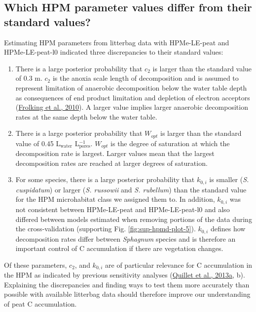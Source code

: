 \documentclass[
  12pt,
]{article}
\begin{document}
\hypertarget{out-discussion-1}{%
\subsection{Which HPM parameter values differ from their standard values?}\label{out-discussion-1}}

Estimating HPM parameters from litterbag data with HPMe-LE-peat and HPMe-LE-peat-l0 indicated three discrepancies to their standard values:

\begin{enumerate}
\def\labelenumi{\arabic{enumi}.}
\item
  There is a large posterior probability that \(c_2\) is larger than the standard value of 0.3 m. \(c_2\) is the anoxia scale length of decomposition and is assumed to represent limitation of anaerobic decomposition below the water table depth as consequences of end product limitation and depletion of electron acceptors (\protect\hyperlink{ref-Frolking.2010}{Frolking et al., 2010}). A larger value implies larger anaerobic decomposition rates at the same depth below the water table.
\item
  There is a large posterior probability that \(W_{opt}\) is larger than the standard value of 0.45 L\(_\text{water}\) L\(_\text{pores}^{-1}\). \(W_{opt}\) is the degree of saturation at which the decomposition rate is largest. Larger values mean that the largest decomposition rates are reached at larger degrees of saturation.
\item
  For some species, there is a large posterior probability that \(k_{0,i}\) is smaller (\emph{S. cuspidatum}) or larger (\emph{S. russowii} and \emph{S. rubellum}) than the standard value for the HPM microhabitat class we assigned them to. In addition, \(k_{0,i}\) was not consistent between HPMe-LE-peat and HPMe-LE-peat-l0 and also differed between models estimated when removing portions of the data during the cross-validation (supporting Fig. \ref{fig:sup-hpmd-plot-5}). \(k_{0,i}\) defines how decomposition rates differ between \emph{Sphagnum} species and is therefore an important control of C accumulation if there are vegetation changes.
\end{enumerate}

Of these parameters, \(c_2\), and \(k_{0,i}\) are of particular relevance for C accumulation in the HPM as indicated by previous sensitivity analyses (\protect\hyperlink{ref-Quillet.2013}{Quillet et al., 2013a}, b). Explaining the discrepancies and finding ways to test them more accurately than possible with available litterbag data should therefore improve our understanding of peat C accumulation.
\end{document}
